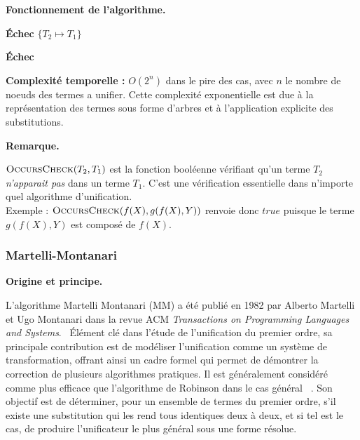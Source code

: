 \documentclass[11pt]{article}
\newenvironment{paraph}[1]{%
  \medskip
  \noindent\textbf{#1.}\quad

  \vspace{0.2cm}
}{%
  \medskip
}
\newenvironment{remarque}{%
    \begin{mdframed}[
        linecolor=sectioncolor!40,
        linewidth=0.8pt,
        backgroundcolor=sectioncolor!5,
        innerleftmargin=10pt,
        innerrightmargin=10pt,
        innertopmargin=6pt,
        innerbottommargin=6pt,
        skipabove=8pt,
        skipbelow=8pt
    ]
    \noindent\textbf{\small\color{sectioncolor}Remarque.}\enspace\small\itshape
}{%
    \end{mdframed}
}
\begin{document}
\begin{paraph}{Fonctionnement de l'algorithme}
\begin{algorithm}[H]
\begin{algorithmic}[1]
            \vspace{0.1cm}
            \State {}
                    \State\Return\textbf{Échec} 
                \EndIf
                \State\Return$\{T_2 \mapsto T_1\}$
            \EndIf
            
            \vspace{0.1cm}
            \State{}
            \State\Return\textbf{Échec} 
            
        \EndProcedure

    \end{algorithmic}
    \end{algorithm}
\end{paraph}

    \textbf{Complexité temporelle :} $O(2^n)$ dans le pire des cas, avec $n$ le nombre de noeuds des termes a unifier. 
    Cette complexité exponentielle est due à la représentation des termes sous forme d'arbres et à l'application explicite des substitutions.

\begin{remarque}
    $\Call{OccursCheck}{T_2, T_1}$ est la fonction booléenne vérifiant
    qu'un terme $T_2$ \emph{n'apparait pas} dans un terme $T_1$.
    C'est une vérification essentielle dans n'importe quel algorithme
    d'unification.\\
    Exemple : $\Call{OccursCheck}{f(X), g(f(X), Y)}$ renvoie donc $true$ puisque le terme $g(f(X), Y)$ est composé de $f(X)$.
\end{remarque}
\newpage

\subsubsection{Martelli-Montanari}\label{sec:mm}

\begin{paraph}{Origine et principe}
    L’algorithme Martelli Montanari (MM) a été publié en 1982 par Alberto Martelli et Ugo
    Montanari dans la revue ACM \textit{Transactions on Programming Languages and Systems}.~\cite{martelli1982efficient}
    Élément clé dans l’étude de l’unification du premier ordre, sa principale contribution est
    de modéliser l'unification comme un système de transformation, offrant ainsi un cadre
    formel qui permet de démontrer la correction de plusieurs algorithmes pratiques. Il est généralement considéré comme plus efficace que l'algorithme 
    de Robinson dans le cas général ~\cite{martelli1982efficient}. Son objectif est de
    déterminer, pour un ensemble de termes du premier ordre, s'il existe une substitution
    qui les rend tous identiques deux à deux, et si tel est le cas, de produire l'unificateur le
    plus général sous une forme résolue.
\end{paraph}
\end{document}
